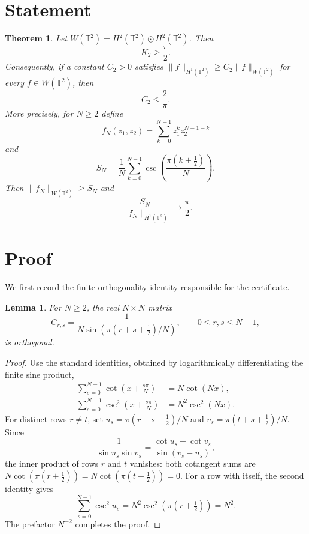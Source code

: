 \documentclass[11pt]{article}
\newtheorem{theorem}{Theorem}
\newtheorem{lemma}{Lemma}
\newcommand{\T}{\mathbb T}
\begin{document}
\section{Statement}

\begin{theorem}\label{thm:main}
Let $W(\T^2)=H^2(\T^2)\odot H^2(\T^2)$.  Then
\[
 K_2\geq \frac{\pi}{2}.
\]
Consequently, if a constant $C_2>0$ satisfies
$\|f\|_{H^1(\T^2)}\geq C_2\|f\|_{W(\T^2)}$ for every $f\in W(\T^2)$, then
\[
 C_2\leq \frac{2}{\pi}.
\]
More precisely, for $N\geq2$ define
\[
 f_N(z_1,z_2)=\sum_{k=0}^{N-1}z_1^kz_2^{N-1-k}
\]
and
\[
 S_N=\frac1N\sum_{k=0}^{N-1}
 \csc\!\left(\frac{\pi(k+\tfrac12)}{N}\right).
\]
Then $\|f_N\|_{W(\T^2)}\geq S_N$ and
\[
 \frac{S_N}{\|f_N\|_{H^1(\T^2)}}\longrightarrow\frac\pi2.
\]
\end{theorem}

\section{Proof}

We first record the finite orthogonality identity responsible for the
certificate.

\begin{lemma}\label{lem:orthogonal}
For $N\geq2$, the real $N\times N$ matrix
\[
 C_{r,s}=\frac{1}{N\sin\!\left(\pi(r+s+\tfrac12)/N\right)},
 \qquad 0\leq r,s\leq N-1,
\]
is orthogonal.
\end{lemma}

\begin{proof}
Use the standard identities, obtained by logarithmically differentiating the
finite sine product,
\begin{align*}
 \sum_{s=0}^{N-1}\cot\left(x+\frac{s\pi}{N}\right)
   &=N\cot(Nx),\\
 \sum_{s=0}^{N-1}\csc^2\left(x+\frac{s\pi}{N}\right)
   &=N^2\csc^2(Nx).
\end{align*}
For distinct rows $r\neq t$, set
$u_s=\pi(r+s+\tfrac12)/N$ and
$v_s=\pi(t+s+\tfrac12)/N$.  Since
\[
 \frac1{\sin u_s\sin v_s}
 =\frac{\cot u_s-\cot v_s}{\sin(v_s-u_s)},
\]
the inner product of rows $r$ and $t$ vanishes: both cotangent sums are
$N\cot(\pi(r+\tfrac12))=N\cot(\pi(t+\tfrac12))=0$.
For a row with itself, the second identity gives
\[
 \sum_{s=0}^{N-1}\csc^2 u_s
 =N^2\csc^2\!\left(\pi(r+\tfrac12)\right)=N^2.
\]
The prefactor $N^{-2}$ completes the proof.
\end{proof}
\end{document}
